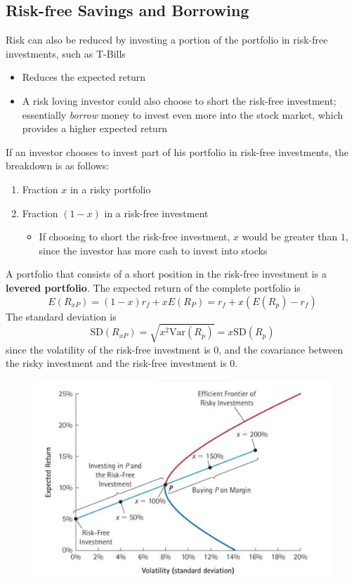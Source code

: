 \documentclass[11pt]{article}
\theoremstyle{definition}
\newcommand{\Var}{\text{Var}}
\newcommand{\Sd}{\text{SD}}
\begin{document}
\subsection{Risk-free Savings and Borrowing}
Risk can also be reduced by investing a portion of the portfolio in risk-free investments, such as T-Bills
\begin{itemize}
    \item Reduces the expected return
    \item A risk loving investor could also choose to short the risk-free investment; essentially \textit{borrow} money to invest even more into the stock market, which provides a higher expected return
\end{itemize}
If an investor chooses to invest part of his portfolio in risk-free investments, the breakdown is as follows:
\begin{enumerate}
    \item Fraction $x$ in a risky portfolio
    \item Fraction $(1 - x)$ in a risk-free investment
    \begin{itemize}
        \item If choosing to short the risk-free investment, $x$ would be greater than $1$, since the investor has more cash to invest into stocks
    \end{itemize}
\end{enumerate}
A portfolio that consists of a short position in the risk-free investment is a \textbf{levered portfolio}. The expected return of the complete portfolio is 
\begin{equation*}
    E(R_{xP}) = (1 - x)r_f + xE(R_P) = r_f + x(E(R_p) - r_f)
\end{equation*}
The standard deviation is 
\begin{equation*}
    \Sd(R_{xP}) = \sqrt{x^2 \Var(R_p)} = x\Sd(R_p)
\end{equation*}
since the volatility of the risk-free investment is $0$, and the covariance between the risky investment and the risk-free investment is $0$.
\begin{figure}[h]
    \centering
    \includegraphics[scale=0.25]{Screenshot 2023-10-29 at 02.33.48.png}
\end{figure}
\end{document}
